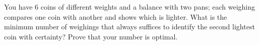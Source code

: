 You have $6$ coins of different weights and a balance with two pans; each weighing compares one coin with another and shows which is lighter. What is the minimum number of weighings that always suffices to identify the second lightest coin with certainty? Prove that your number is optimal.

